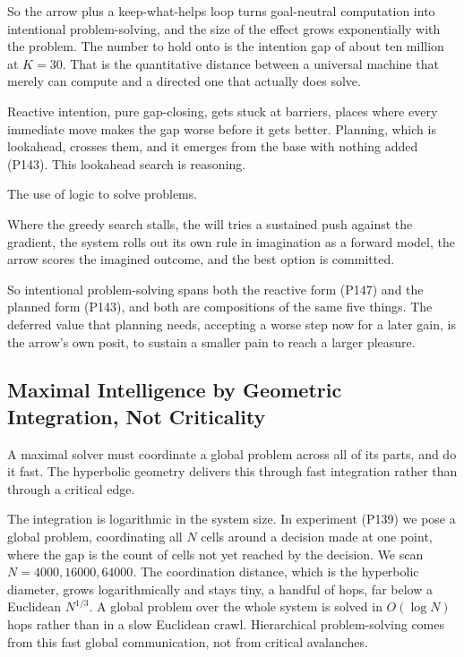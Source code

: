 So the arrow plus a keep-what-helps loop turns goal-neutral computation into intentional problem-solving, and the size of the effect grows exponentially with the problem. The number to hold onto is the intention gap of about ten million at $K = 30$. That is the quantitative distance between a universal machine that merely can compute and a directed one that actually does solve.

Reactive intention, pure gap-closing, gets stuck at barriers, places where every immediate move makes the gap worse before it gets better. Planning, which is lookahead, crosses them, and it emerges from the base with nothing added (P143). This lookahead search is reasoning.

\begin{definition}[Reasoning]
The use of logic to solve problems.
\end{definition} Where the greedy search stalls, the will tries a sustained push against the gradient, the system rolls out its own rule in imagination as a forward model, the arrow scores the imagined outcome, and the best option is committed.

So intentional problem-solving spans both the reactive form (P147) and the planned form (P143), and both are compositions of the same five things. The deferred value that planning needs, accepting a worse step now for a later gain, is the arrow's own posit, to sustain a smaller pain to reach a larger pleasure.

\subsection{Maximal Intelligence by Geometric Integration, Not Criticality}

A maximal solver must coordinate a global problem across all of its parts, and do it fast. The hyperbolic geometry delivers this through fast integration rather than through a critical edge.

The integration is logarithmic in the system size. In experiment (P139) we pose a global problem, coordinating all $N$ cells around a decision made at one point, where the gap is the count of cells not yet reached by the decision. We scan $N = 4000, 16000, 64000$. The coordination distance, which is the hyperbolic diameter, grows logarithmically and stays tiny, a handful of hops, far below a Euclidean $N^{1/3}$. A global problem over the whole system is solved in $O(\log N)$ hops rather than in a slow Euclidean crawl. Hierarchical problem-solving comes from this fast global communication, not from critical avalanches.

